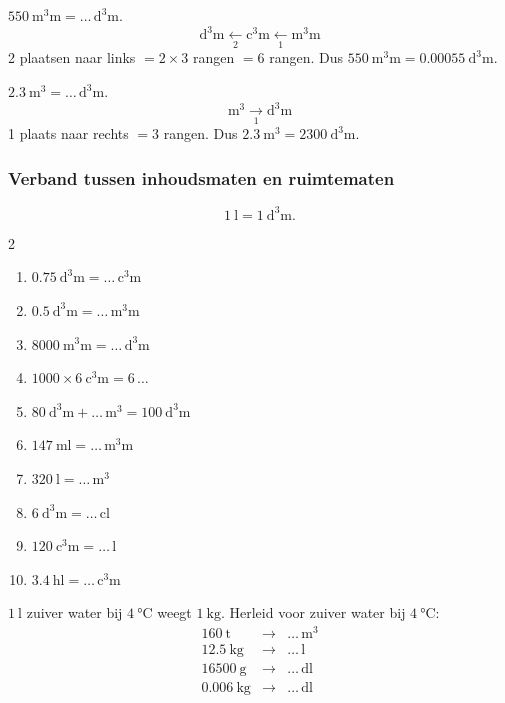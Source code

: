 \documentclass{bis}
\begin{document}
\begin{voorbeeld}
\(\SI{550}{\cubic\milli\metre}=\ldots\,\si{\cubic\deci\metre}\).
\[
\si{\cubic\deci\metre} \xleftarrow[2]{}\si{\cubic\centi\metre} \xleftarrow[1]{}\si{\cubic\milli\metre}
\]
2 plaatsen naar links \(=2\times3\) rangen \(=6\) rangen. Dus \(\SI{550}{\cubic\milli\metre}=\SI{0.00055}{\cubic\deci\metre}\).
\end{voorbeeld}

\begin{voorbeeld}
\(\SI{2.3}{\cubic\metre}=\ldots\,\si{\cubic\deci\metre}\).
\[
\si{\cubic\metre} \xrightarrow[1]{}\si{\cubic\deci\metre}
\]
1 plaats naar rechts \(=3\) rangen. Dus \(\SI{2.3}{\cubic\metre}=\SI{2300}{\cubic\deci\metre}\).
\end{voorbeeld}

\subsubsection{Verband tussen inhoudsmaten en ruimtematen}
\[\SI{1}{\litre}=\SI{1}{\cubic\deci\metre}.\]

\begin{exercise}
\begin{multicols}{2}
\begin{enumerate}
  \item \(\SI{0.75}{\cubic\deci\metre}=\ldots\,\si{\cubic\centi\metre}\)
  \item \(\SI{0.5}{\cubic\deci\metre}=\ldots\,\si{\cubic\milli\metre}\)
  \item \(\SI{8000}{\cubic\milli\metre}=\ldots\,\si{\cubic\deci\metre}\)
  \item \(\num{1000}\times \SI{6}{\cubic\centi\metre}=6\,\ldots\)
  \item \(\SI{80}{\cubic\deci\metre}+\ldots\,\si{\cubic\metre}=\SI{100}{\cubic\deci\metre}\)
  \item \(\SI{147}{\milli\litre}=\ldots\,\si{\cubic\milli\metre}\)
  \item \(\SI{320}{\litre}=\ldots\,\si{\cubic\metre}\)
  \item \(\SI{6}{\cubic\deci\metre}=\ldots\,\si{\centi\litre}\)
  \item \(\SI{120}{\cubic\centi\metre}=\ldots\,\si{\litre}\)
  \item \(\SI{3.4}{\hecto\litre}=\ldots\,\si{\cubic\centi\metre}\)
\end{enumerate}
\end{multicols}

\(\SI{1}{\litre}\) zuiver water bij \(\SI{4}{\celsius}\) weegt \(\SI{1}{\kilo\gram}\). Herleid voor zuiver water bij \(\SI{4}{\celsius}\):
\[
\begin{array}{rcl}
\SI{160}{\tonne} & \to & \ldots\,\si{\cubic\metre} \\
\SI{12.5}{\kilo\gram} & \to & \ldots\,\si{\litre} \\
\SI{16500}{\gram} & \to & \ldots\,\si{\deci\litre} \\
\SI{0.006}{\kilo\gram} & \to & \ldots\,\si{\deci\litre}
\end{array}
\]
\end{exercise}
\end{document}
